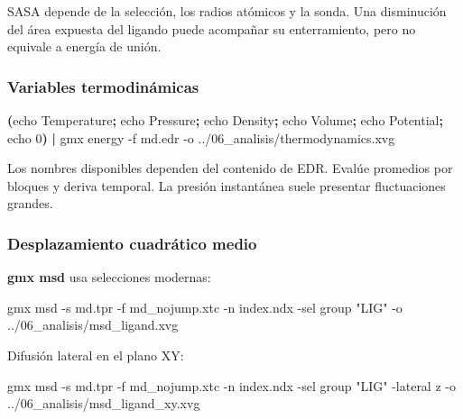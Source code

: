 \documentclass[
  spanish,
  11pt,
  a4paper]{article}
\newenvironment{Shaded}{\begin{snugshade}}{\end{snugshade}}
\newcommand{\AttributeTok}[1]{\textcolor[rgb]{0.13,0.29,0.53}{#1}}
\newcommand{\BuiltInTok}[1]{#1}
\newcommand{\ExtensionTok}[1]{#1}
\newcommand{\KeywordTok}[1]{\textcolor[rgb]{0.13,0.29,0.53}{\textbf{#1}}}
\newcommand{\NormalTok}[1]{#1}
\newcommand{\StringTok}[1]{\textcolor[rgb]{0.31,0.60,0.02}{#1}}
\begin{document}
SASA depende de la selección, los radios atómicos y la sonda. Una
disminución del área expuesta del ligando puede acompañar su
enterramiento, pero no equivale a energía de unión.

\subsubsection{Variables
termodinámicas}\label{variables-termodinuxe1micas}

\begin{Shaded}
\begin{Highlighting}[]
\KeywordTok{(}\BuiltInTok{echo}\NormalTok{ Temperature}\KeywordTok{;} \BuiltInTok{echo}\NormalTok{ Pressure}\KeywordTok{;} \BuiltInTok{echo}\NormalTok{ Density}\KeywordTok{;} \BuiltInTok{echo}\NormalTok{ Volume}\KeywordTok{;} \BuiltInTok{echo}\NormalTok{ Potential}\KeywordTok{;} \BuiltInTok{echo}\NormalTok{ 0}\KeywordTok{)} \KeywordTok{|}
\ExtensionTok{gmx}\NormalTok{ energy     }\AttributeTok{{-}f}\NormalTok{ md.edr     }\AttributeTok{{-}o}\NormalTok{ ../06\_analisis/thermodynamics.xvg}
\end{Highlighting}
\end{Shaded}

Los nombres disponibles dependen del contenido de EDR. Evalúe promedios
por bloques y deriva temporal. La presión instantánea suele presentar
fluctuaciones grandes.

\subsubsection{Desplazamiento cuadrático
medio}\label{desplazamiento-cuadruxe1tico-medio}

\textbf{gmx msd} usa selecciones modernas:

\begin{Shaded}
\begin{Highlighting}[]
\ExtensionTok{gmx}\NormalTok{ msd     }\AttributeTok{{-}s}\NormalTok{ md.tpr     }\AttributeTok{{-}f}\NormalTok{ md\_nojump.xtc     }\AttributeTok{{-}n}\NormalTok{ index.ndx     }\AttributeTok{{-}sel} \StringTok{\textquotesingle{}group "LIG"\textquotesingle{}}     \AttributeTok{{-}o}\NormalTok{ ../06\_analisis/msd\_ligand.xvg}
\end{Highlighting}
\end{Shaded}

Difusión lateral en el plano XY:

\begin{Shaded}
\begin{Highlighting}[]
\ExtensionTok{gmx}\NormalTok{ msd     }\AttributeTok{{-}s}\NormalTok{ md.tpr     }\AttributeTok{{-}f}\NormalTok{ md\_nojump.xtc     }\AttributeTok{{-}n}\NormalTok{ index.ndx     }\AttributeTok{{-}sel} \StringTok{\textquotesingle{}group "LIG"\textquotesingle{}}     \AttributeTok{{-}lateral}\NormalTok{ z     }\AttributeTok{{-}o}\NormalTok{ ../06\_analisis/msd\_ligand\_xy.xvg}
\end{Highlighting}
\end{Shaded}
\end{document}
